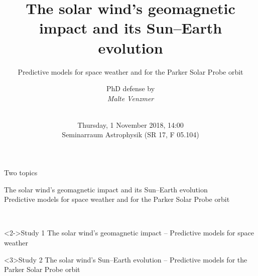 




\title[Solar wind]{The solar wind's geomagnetic impact and its Sun–Earth evolution}
\subtitle{Predictive models for space weather and for the Parker Solar Probe orbit}
\author[MV]{PhD defense by\\\textit{Malte Venzmer}}
\date[2018]{\vspace*{0.5cm}\\ Thursday, 1 November 2018, 14:00\\Seminarraum Astrophysik (SR 17, F 05.104)}
\subject{Solar wind}




\AtBeginSection[]{
	\subsection{}	%
}

\frame[plain]{\titlepage}

\begin{frame}[c]{Two topics}{}
	\begin{block}{}
		\color{blue} \centering \Large The solar wind's geomagnetic impact and its Sun–Earth evolution\\
		\large Predictive models for space weather and for the Parker Solar Probe orbit
	\end{block}
	
	\ 
	
	\begin{block}<2->{Study 1}
		The solar wind's geomagnetic impact -- Predictive models for space weather
	\end{block}
	\begin{block}{Study 2}
		The solar wind's Sun–Earth evolution -- Predictive models for the Parker Solar Probe orbit
	\end{block}
\end{frame}

